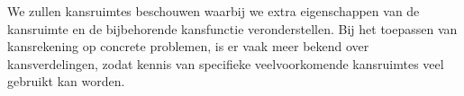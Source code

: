 \documentclass[a4paper]{report}
\theoremstyle{definition}
\begin{document}
We zullen kansruimtes beschouwen waarbij we extra eigenschappen van de kansruimte en de bijbehorende kansfunctie veronderstellen.
Bij het toepassen van kansrekening op concrete problemen, is er vaak meer bekend over kansverdelingen, zodat kennis van specifieke veelvoorkomende kansruimtes veel gebruikt kan worden.
%
%
%
%
\end{document}
